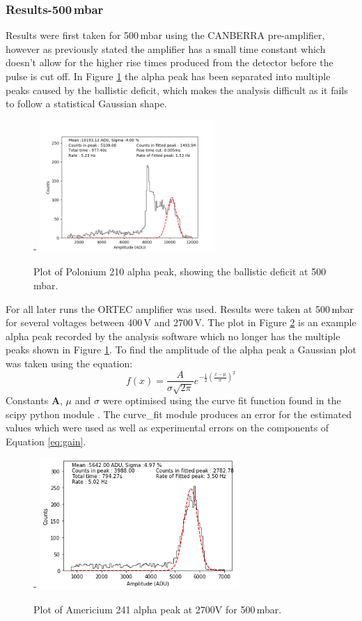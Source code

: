 \documentclass[a4paper]{article}
\begin{document}
\subsubsection{Results-500\,mbar}
Results were first taken for 500\,mbar using the CANBERRA pre-amplifier, however as previously stated the amplifier has a small time constant which doesn't allow for the higher rise times produced from the detector before the pulse is cut off. In Figure \ref{fig:uj} the alpha peak has been separated into multiple peaks caused by the ballistic deficit, which makes the analysis difficult as it fails to follow a statistical Gaussian shape.
\begin{figure}[H]-
    \centering
    \includegraphics[height=5cm]{uj27n001_amp.png}
    \caption{Plot of Polonium 210 alpha peak, showing the ballistic deficit at 500\,mbar.}
    \label{fig:uj}
\end{figure}
\noindent For all later runs the ORTEC amplifier was used. Results were taken at 500\,mbar for several voltages between 400\,V and 2700\,V. The plot in Figure \ref{fig:uk} is an example alpha peak recorded by the analysis software which no longer has the multiple peaks shown in Figure \ref{fig:uj}. To find the amplitude of the alpha peak a Gaussian plot was taken using the equation:
\begin{equation}
    f(x) = \frac{A}{\sigma\sqrt{2\pi}}e^{-\frac{1}{2}(\frac{x-\mu}{\sigma})^2}
    \label{eq:guas}
\end{equation}
Constants \textbf{A}, \textbf{$\mu$} and \textbf{$\sigma$} were optimised using the curve fit function found in the scipy python module \cite{scipy}. The curve\_fit module produces an error for the estimated values which were used as well as experimental errors on the components of Equation \ref{eq:gain}. 
\begin{figure}[H]-
    \centering
    \includegraphics[height=5cm]{uk09n002_amp.png}
    \caption{Plot of Americium 241 alpha peak at 2700V for 500\,mbar.}
    \label{fig:uk}
\end{figure}
\end{document}

